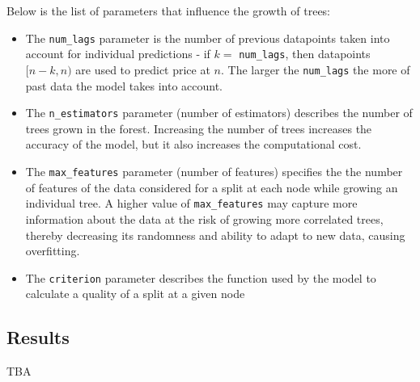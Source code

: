 Below is the list of parameters that influence the growth of trees:

\begin{itemize}

	\item The \verb|num_lags| parameter is the number of previous datapoints taken into account for individual predictions - if \(k=\) \verb|num_lags|, then datapoints \([n-k, n)\) are used to predict price at \(n\). The larger the \verb|num_lags| the more of past data the model takes into account.

	\item The \verb|n_estimators| parameter (number of estimators) describes the number of trees grown in the forest. Increasing the number of trees increases the accuracy of the model, but it also increases the computational cost.

	\item The \verb|max_features| parameter (number of features) specifies the the number of features of the data considered for a split at each node while growing an individual tree. A higher value of \verb|max_features| may capture more information about the data at the risk of growing more correlated trees, thereby decreasing its randomness and ability to adapt to new data, causing overfitting.

	\item The \verb|criterion| parameter describes the function used by the model to calculate a quality of a split at a given node

\end{itemize}



\subsection{Results}
TBA

